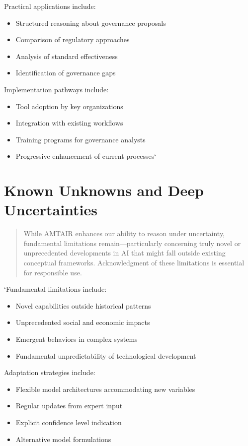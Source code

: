 \documentclass[12pt,a4paper]{report}
\providecommand{\tightlist}{%
  \setlength{\itemsep}{0pt}\setlength{\parskip}{0pt}}
\begin{document}
Practical applications include:

\begin{itemize}
\tightlist
\item
  Structured reasoning about governance proposals
\item
  Comparison of regulatory approaches
\item
  Analysis of standard effectiveness
\item
  Identification of governance gaps
\end{itemize}

Implementation pathways include:

\begin{itemize}
\tightlist
\item
  Tool adoption by key organizations
\item
  Integration with existing workflows
\item
  Training programs for governance analysts
\item
  Progressive enhancement of current processes`
\end{itemize}

\section{Known Unknowns and Deep
Uncertainties}\label{sec-deep-uncertainties}

\begin{quote}
While AMTAIR enhances our ability to reason under uncertainty,
fundamental limitations remain---particularly concerning truly novel or
unprecedented developments in AI that might fall outside existing
conceptual frameworks. Acknowledgment of these limitations is essential
for responsible use.
\end{quote}

`Fundamental limitations include:

\begin{itemize}
\tightlist
\item
  Novel capabilities outside historical patterns
\item
  Unprecedented social and economic impacts
\item
  Emergent behaviors in complex systems
\item
  Fundamental unpredictability of technological development
\end{itemize}

Adaptation strategies include:

\begin{itemize}
\tightlist
\item
  Flexible model architectures accommodating new variables
\item
  Regular updates from expert input
\item
  Explicit confidence level indication
\item
  Alternative model formulations
\end{itemize}
\end{document}
